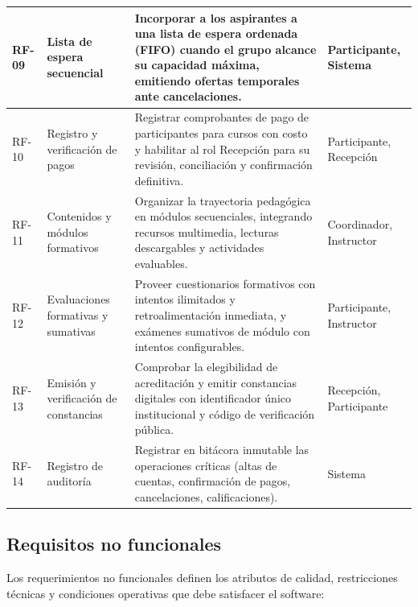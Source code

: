\begin{table}[htbp]
\begin{tabularx}{\textwidth}{|p{2.0cm}|p{3.8cm}|X|p{2.2cm}|}
\hline
RF-09 & Lista de espera secuencial & Incorporar a los aspirantes a una lista de espera ordenada (FIFO) cuando el grupo alcance su capacidad máxima, emitiendo ofertas temporales ante cancelaciones. & Participante, Sistema \\
\hline
RF-10 & Registro y verificación de pagos & Registrar comprobantes de pago de participantes para cursos con costo y habilitar al rol Recepción para su revisión, conciliación y confirmación definitiva. & Participante, Recepción \\
\hline
RF-11 & Contenidos y módulos formativos & Organizar la trayectoria pedagógica en módulos secuenciales, integrando recursos multimedia, lecturas descargables y actividades evaluables. & Coordinador, Instructor \\
\hline
RF-12 & Evaluaciones formativas y sumativas & Proveer cuestionarios formativos con intentos ilimitados y retroalimentación inmediata, y exámenes sumativos de módulo con intentos configurables. & Participante, Instructor \\
\hline
RF-13 & Emisión y verificación de constancias & Comprobar la elegibilidad de acreditación y emitir constancias digitales con identificador único institucional y código de verificación pública. & Recepción, Participante \\
\hline
RF-14 & Registro de auditoría & Registrar en bitácora inmutable las operaciones críticas (altas de cuentas, confirmación de pagos, cancelaciones, calificaciones). & Sistema \\
\hline
\end{tabularx}
\end{table}

\subsection{Requisitos no funcionales}
\label{sec:requisitos_no_funcionales}

Los requerimientos no funcionales definen los atributos de calidad, restricciones técnicas y condiciones operativas que debe satisfacer el software:

